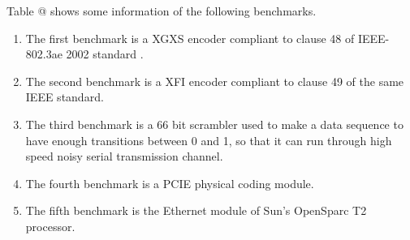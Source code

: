 \documentclass[journal]{IEEEtran}
\makeatletter
\newcommand{\Rmnum}[1]{\expandafter\@slowromancap\romannumeral #1@}
\makeatother
\begin{document}

Table \Rmnum{1} shows some information of the following benchmarks.
\begin{enumerate}
  \item The first benchmark is a XGXS encoder compliant to clause 48 of IEEE-802.3ae 2002 standard \cite{IEEE80232002}.
  \item The second benchmark is a XFI encoder compliant to clause 49 of the same IEEE standard.
  \item The third benchmark is a 66 bit scrambler used to make a data sequence to have enough transitions between 0 and 1,
        so that it can run through high speed noisy serial transmission channel.
  \item The fourth benchmark is a PCIE physical coding module.
  \item The fifth benchmark is the Ethernet module of Sun's OpenSparc T2 processor.
\end{enumerate}

\end{document}
